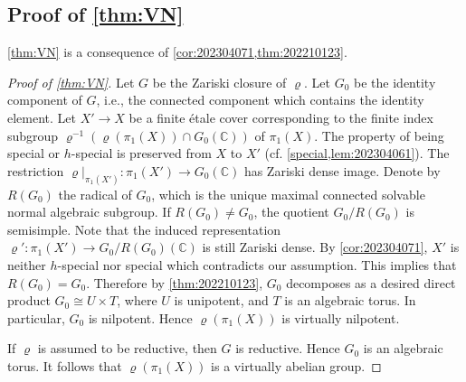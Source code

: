 \documentclass[11pt,english]{smfart}
\theoremstyle{plain}
\theoremstyle{definition}
\theoremstyle{remark}
\numberwithin{equation}{subsection}
\theoremstyle{plain}
\newcommand{\bC}{\mathbb{C}}
\begin{document}
\subsection{Proof of \cref{thm:VN}}  \label{s5}
\cref{thm:VN} is a consequence of \cref{cor:202304071,thm:202210123}. 
\begin{proof}[Proof of \cref{thm:VN}] 
Let $G$ be the Zariski closure of $\varrho$.
Let $G_0$ be the identity component of $G$, i.e., the connected component which contains the identity element.
Let $X'\to X$ be a finite \'etale cover   corresponding to the finite index subgroup $\varrho^{-1}(\varrho(\pi_1(X))\cap G_0(\bC))$ of $\pi_1(X)$.
The property of being special or $h$-special is preserved from $X$ to $X'$ (cf. \cref{special,lem:202304061}).
The restriction $\varrho|_{\pi_1(X')}:\pi_1(X')\to G_0(\bC)$ has Zariski dense image.
 Denote by $R(G_0)$   the radical of $G_0$, which is the unique maximal connected solvable normal algebraic subgroup.
 If $R(G_0)\neq G_0$, the quotient $G_0/R(G_0)$ is semisimple.
 Note that the  induced representation $\varrho':\pi_1(X')\to G_0/R(G_0)(\bC)$ is still Zariski dense.   By \cref{cor:202304071}, $X'$ is neither $h$-special nor  special which contradicts our assumption. This implies that $R(G_0)=G_0$.     
Therefore by \cref{thm:202210123}, $G_0$  decomposes as a desired direct product $G_0 \cong U \times T$, where $U$ is unipotent, and $T$ is an algebraic torus.
 In particular, $G_0$ is nilpotent.
 Hence $\varrho(\pi_1(X))$ is virtually nilpotent. 
 
	
	If  $\varrho$ is assumed to be reductive, then $G$ is reductive. Hence
	$G_0$ is an algebraic torus.  It follows that $\varrho(\pi_1(X))$ is a virtually abelian group. 
\end{proof}
\end{document}
